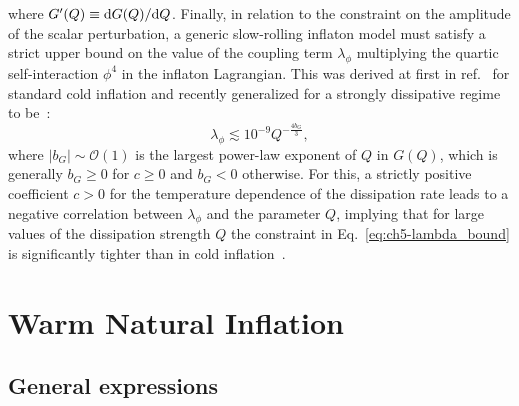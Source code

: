 where $G^\prime(Q)\equiv {\rm d}G(Q)/{\rm d}Q$. Finally, in relation to the constraint on the amplitude of the scalar perturbation, a generic slow-rolling inflaton model must satisfy a strict upper bound on the value of the coupling term $\lambda_\phi$ multiplying the quartic self-interaction $\phi^4$ in the inflaton Lagrangian. This was derived at first in ref.~\cite{Adams:1990pn} for standard cold inflation and recently generalized for a strongly dissipative regime to be~\cite{Montefalcone:2022owy}:
\begin{equation}
        \lambda_\phi \lesssim 10^{-9} Q^{-\frac{4b_G}{3}}, \label{eq:ch5-lambda_bound}
\end{equation}
where $|b_G|\sim\mathcal{O}(1)$ is the largest power-law exponent of $Q$ in $G(Q)$, which is generally $b_G \geq0$ for $c\geq0$ and $b_G <0$ otherwise. For this, a strictly positive coefficient $c>0$ for the temperature dependence of the dissipation rate leads to a negative correlation between $\lambda_\phi$ and the parameter $Q$, implying that for large values of the dissipation strength $Q$ the constraint in Eq.~\ref{eq:ch5-lambda_bound} is significantly tighter than in cold inflation~\cite{Montefalcone:2022owy}.

\section{Warm Natural Inflation \label{sec:ch5-3}}

\subsection{General expressions}
\label{sec:ch5-3.1}

